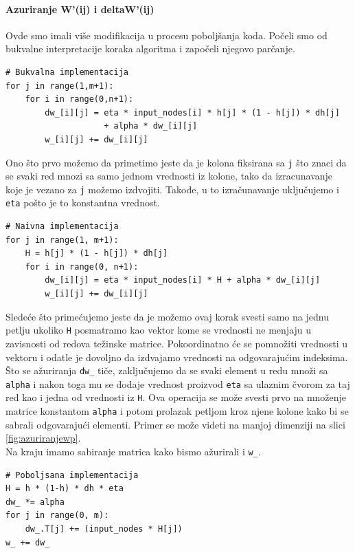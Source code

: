 \documentclass[a4paper]{article}
\begin{document}
\pagebreak
\paragraph{Azuriranje W'(ij) i deltaW'(ij)} 
Ovde smo imali više modifikacija u procesu poboljšanja koda. Počeli smo od bukvalne interpretacije koraka algoritma i započeli njegovo parčanje.

\begin{verbatim}
# Bukvalna implementacija
for j in range(1,m+1):    
    for i in range(0,n+1): 
        dw_[i][j] = eta * input_nodes[i] * h[j] * (1 - h[j]) * dh[j] 
                    + alpha * dw_[i][j] 
        w_[i][j] += dw_[i][j]
\end{verbatim}
Ono što prvo možemo da primetimo jeste da je kolona fiksirana sa \texttt{j} što znaci da se svaki red mnozi sa samo jednom vrednosti iz kolone, tako da izracunavanje koje je vezano za \texttt{j} možemo izdvojiti. Takođe, u to izračunavanje uključujemo i \texttt{eta} pošto je to konstantna vrednost. 
\begin{verbatim}
# Naivna implementacija
for j in range(1, m+1):
    H = h[j] * (1 - h[j]) * dh[j]
    for i in range(0, n+1):
        dw_[i][j] = eta * input_nodes[i] * H + alpha * dw_[i][j]
        w_[i][j] += dw_[i][j]
\end{verbatim}
Sledeće što primećujemo jeste da je možemo ovaj korak svesti samo na jednu petlju ukoliko \texttt{H} posmatramo kao vektor kome se vrednosti ne menjaju u zavisnosti od redova težinske matrice. Pokoordinatno će se pomnožiti vrednosti u vektoru i odatle je dovoljno da izdvajamo vrednosti na odgovarajućim indeksima. 
\\
Što se ažuriranja \texttt{dw\_} tiče, zaključujemo da se svaki element u redu množi sa \texttt{alpha} i nakon toga mu se dodaje vrednost proizvod \texttt{eta} sa ulaznim čvorom za taj red kao i jedna od vrednosti iz \texttt{H}. Ova operacija se može svesti prvo na množenje matrice konstantom \texttt{alpha} i potom prolazak petljom kroz njene kolone kako bi se sabrali odgovarajući elementi. Primer se može videti na manjoj dimenziji na slici \ref{fig:azuriranjewp}. \\
Na kraju imamo sabiranje matrica kako bismo ažurirali i \texttt{w\_}.

\begin{verbatim}
# Poboljsana implementacija
H = h * (1-h) * dh * eta
dw_ *= alpha
for j in range(0, m):
    dw_.T[j] += (input_nodes * H[j])
w_ += dw_
\end{verbatim}
\end{document}
